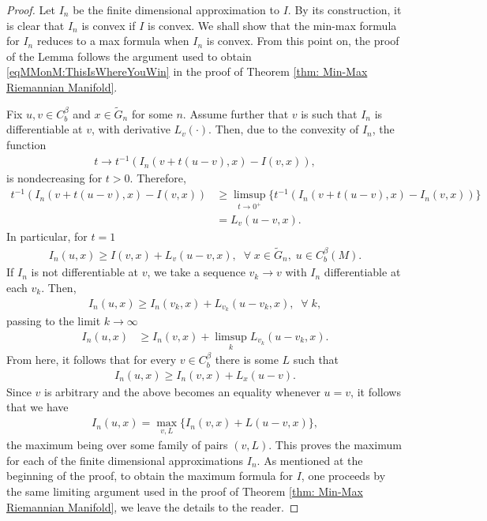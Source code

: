 \documentclass[11pt,reqno]{amsart}
\numberwithin{equation}{section}
\theoremstyle{plain}
\begin{document}
\begin{proof}
  Let $I_n$ be the finite dimensional approximation to $I$. By its construction, it is clear that $I_n$ is convex if $I$ is convex. We shall show that the min-max formula for $I_n$ reduces to a max formula when $I_n$ is convex. From this point on, the proof of the Lemma follows the argument used to obtain \eqref{eqMMonM:ThisIsWhereYouWin} in the proof of Theorem \ref{thm: Min-Max Riemannian Manifold}.
  
  Fix $u,v \in C^\beta_b$ and $x \in \tilde G_n$ for some $n$. Assume further that $v$ is such that $I_n$ is differentiable at $v$, with derivative $L_v(\cdot)$. Then, due to the convexity of $I_n$, the function
  \begin{align*}	
    t \to t^{-1}\left ( I_n(v+t(u-v),x)-I(v,x) \right ),	
  \end{align*}	
  is nondecreasing for $t>0$. Therefore, 
  \begin{align*}
    t^{-1}\left ( I_n(v+t(u-v),x)-I(v,x) \right ) & \geq \limsup \limits_{t\to 0^+} \{ t^{-1}\left ( I_n(v+t(u-v),x)-I_n(v,x)  \right )\}\\
      & = L_v(u-v,x).	
  \end{align*}
  In particular, for $t=1$
  \begin{align*}
    I_n(u,x) \geq I(v,x)+L_v(u-v,x),\;\;\forall\;x\in \tilde G_n,\;u\in C^\beta_b(M).
  \end{align*}	  	
  If $I_n$ is not differentiable at $v$, we take a sequence $v_k \to v$ with $I_n$ differentiable at each $v_k$. Then,
  \begin{align*}
    I_n(u,x)\geq I_n(v_k,x)+L_{v_k}(u-v_k,x),\;\;\forall\;k,
  \end{align*}
  passing to the limit $k \to \infty$ 
  \begin{align*}
    I_n(u,x) & \geq I_n(v,x)+\limsup \limits_{k}L_{v_k}(u-v_k,x).
  \end{align*}
  From here, it follows that for every $v\in C^\beta_b$ there is some $L$ such that
  \begin{align*}
    I_n(u,x)\geq I_n(v,x)+L_x(u-v).
  \end{align*}
  Since $v$ is arbitrary and the above becomes an equality whenever $u=v$, it follows that we have
  \begin{align*}
    I_n(u,x) = \max \limits_{v,L} \{ I_n(v,x)+L(u-v,x)\},
  \end{align*}	  	
  the maximum being over some family of pairs $(v,L)$. This proves the maximum for each of the finite dimensional approximations $I_n$. As mentioned at the beginning of the proof, to obtain the maximum formula for $I$, one proceeds by the same limiting argument used in the proof of Theorem \ref{thm: Min-Max Riemannian Manifold}, we leave the details to the reader. 
\end{proof}
\end{document}
